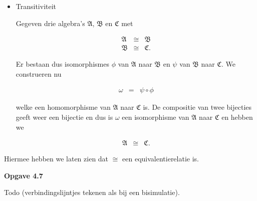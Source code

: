 \documentclass[a4paper,11pt]{article}
\begin{document}
\begin{enumerate}
\begin{itemize}
\item{Transitiviteit}

Gegeven drie algebra's $\mathfrak{A}$, $\mathfrak{B}$ en $\mathfrak{C}$ met

\begin{eqnarray*}
\mathfrak{A} & \cong & \mathfrak{B} \\
\mathfrak{B} & \cong & \mathfrak{C}.
\end{eqnarray*}

Er bestaan dus isomorphismes $\phi$ van $\mathfrak{A}$ naar $\mathfrak{B}$ en
$\psi$ van $\mathfrak{B}$ naar $\mathfrak{C}$. We construeren nu

\begin{eqnarray*}
\omega & = & \psi \circ \phi
\end{eqnarray*}

welke een homomorphisme van $\mathfrak{A}$ naar $\mathfrak{C}$ is. De
compositie van twee bijecties geeft weer een bijectie en dus is $\omega$ een
isomorphisme van $\mathfrak{A}$ naar $\mathfrak{C}$ en hebben we

\begin{eqnarray*}
\mathfrak{A} & \cong & \mathfrak{C}.
\end{eqnarray*}

\end{itemize}

Hiermee hebben we laten zien dat $\cong$ een equivalentierelatie is.\\[2em]

\end{enumerate}


{\bf Opgave 4.7}

Todo (verbindingslijntjes tekenen als bij een bisimulatie).\\[2em]
\end{document}
